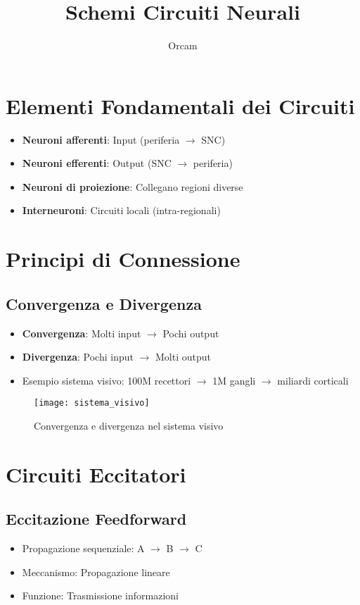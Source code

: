 \documentclass[12pt]{article}
\title{Schemi Circuiti Neurali}
\author{Orcam}
\date{}
\begin{document}
\maketitle

\section{Elementi Fondamentali dei Circuiti}
\begin{itemize}
    \item \textbf{Neuroni afferenti}: Input (periferia $\rightarrow$ SNC)
    \item \textbf{Neuroni efferenti}: Output (SNC $\rightarrow$ periferia)
    \item \textbf{Neuroni di proiezione}: Collegano regioni diverse
    \item \textbf{Interneuroni}: Circuiti locali (intra-regionali)
\end{itemize}

\section{Principi di Connessione}
\subsection{Convergenza e Divergenza}
\begin{itemize}
    \item \textbf{Convergenza}: Molti input $\rightarrow$ Pochi output
    \item \textbf{Divergenza}: Pochi input $\rightarrow$ Molti output
    \item Esempio sistema visivo: 100M recettori $\rightarrow$ 1M gangli $\rightarrow$ miliardi corticali
\end{itemize}

\begin{figure}[h]
    \centering
    \texttt{[image: sistema\_visivo]}
    \caption{Convergenza e divergenza nel sistema visivo}
\end{figure}

\section{Circuiti Eccitatori}
\subsection{Eccitazione Feedforward}
\begin{itemize}
    \item Propagazione sequenziale: A $\rightarrow$ B $\rightarrow$ C
    \item Meccanismo: Propagazione lineare
    \item Funzione: Trasmissione informazioni
\end{itemize}
\end{document}
